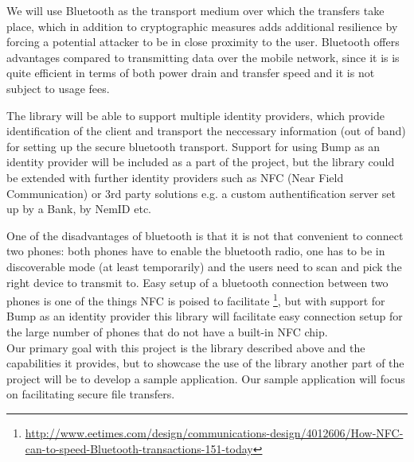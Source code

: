 \documentclass[a4paper,11pt]{article}
\begin{document}
We will use Bluetooth as the transport medium over which the transfers take place, which in addition to cryptographic measures adds additional resilience by forcing a potential attacker to be in close proximity to the user.
Bluetooth offers advantages compared to transmitting data over the mobile network, since it is is quite efficient in terms of both power drain and transfer speed and it is not subject to usage fees. 

The library will be able to support multiple identity providers, which provide identification of the client and transport the neccessary information (out of band) for setting up the secure bluetooth transport. Support for using Bump as an identity provider will be included as a part of the project, but the library could be extended with further identity providers such as NFC (Near Field Communication) or 3rd party solutions e.g. a custom authentification server set up by a Bank, by NemID etc.

One of the disadvantages of bluetooth is that it is not that convenient to connect two phones: both phones have to enable the bluetooth radio, one has to be in discoverable mode (at least temporarily) and the users need to scan and pick the right device to transmit to. Easy setup of a bluetooth connection between two phones is one of the things NFC is poised to facilitate
\footnote{
\url{http://www.eetimes.com/design/communications-design/4012606/How-NFC-can-to-speed-Bluetooth-transactions-151-today}
}, but with support for Bump as an identity provider this library will facilitate easy connection setup for the large number of phones that do not have a built-in NFC chip.\\


\noindent
Our primary goal with this project is the library described above and the capabilities it provides, but to showcase the use of the library another part of the project will be to develop a sample application. Our sample application will focus on facilitating secure file transfers.
\end{document}

